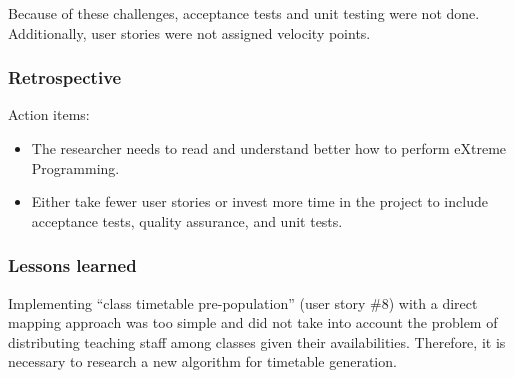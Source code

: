 Because of these challenges, acceptance tests and unit testing were not done. Additionally, user stories were not assigned velocity points.

\subsubsection{Retrospective}
Action items:
\begin{itemize}
    \item The researcher needs to read and understand better how to perform eXtreme Programming.
    \item Either take fewer user stories or invest more time in the project to include acceptance tests, quality assurance, and unit tests.
\end{itemize}

\subsubsection{Lessons learned}
Implementing “class timetable pre-population” (user story \#8) with a direct mapping approach was too simple and did not take into account the problem of distributing teaching staff among classes given their availabilities.
Therefore, it is necessary to research a new algorithm for timetable generation.
